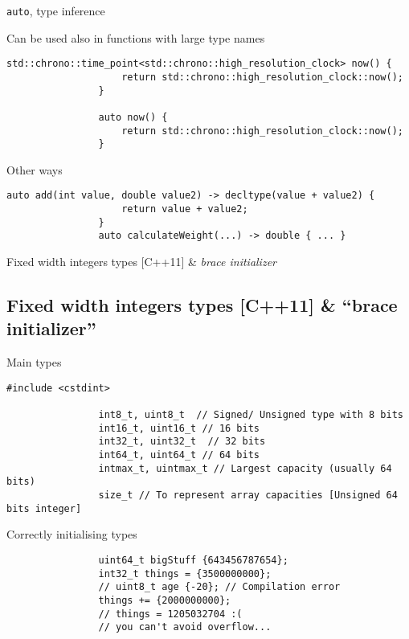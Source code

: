 \documentclass{beamer}
\newcommand{\normalSizeItem}[1] {
  \normalsize{\item #1}
}
\begin{document}
		\begin{frame}[fragile]{\texttt{auto}, type inference}	
			\begin{itemize}
			
				\normalSizeItem{Can be used also in functions with large type names}
				\begin{lstlisting}[basicstyle={\tiny\ttfamily}]
				std::chrono::time_point<std::chrono::high_resolution_clock> now() {
					return std::chrono::high_resolution_clock::now();
				}
				
				auto now() {
					return std::chrono::high_resolution_clock::now();
				}
				\end{lstlisting}
								
				\normalSizeItem { Other ways }
				\begin{lstlisting}[basicstyle={\tiny\ttfamily}]
				auto add(int value, double value2) -> decltype(value + value2) {
					return value + value2;
				}
				auto calculateWeight(...) -> double { ... }
				\end{lstlisting}
				
			\end{itemize}
		\end{frame}
		
		\begin{frame}[fragile]{Fixed width integers types [C++11] \& \textit{brace initializer}}	
			\subsection{Fixed width integers types [C++11] \& ``brace initializer''}
			\begin{itemize}
			
				\normalSizeItem{Main types}
				\begin{lstlisting}[basicstyle={\tiny\ttfamily}]
				#include <cstdint>

				int8_t, uint8_t  // Signed/ Unsigned type with 8 bits
				int16_t, uint16_t // 16 bits
				int32_t, uint32_t  // 32 bits
				int64_t, uint64_t // 64 bits
				intmax_t, uintmax_t // Largest capacity (usually 64 bits)
				size_t // To represent array capacities [Unsigned 64 bits integer]
				\end{lstlisting}
								
				\normalSizeItem { Correctly initialising types }
				\begin{lstlisting}
				uint64_t bigStuff {643456787654};
				int32_t things = {3500000000};
				// uint8_t age {-20}; // Compilation error
				things += {2000000000};
				// things = 1205032704 :(
				// you can't avoid overflow...
				\end{lstlisting}
				
			\end{itemize}
		\end{frame}
		
\end{document}
